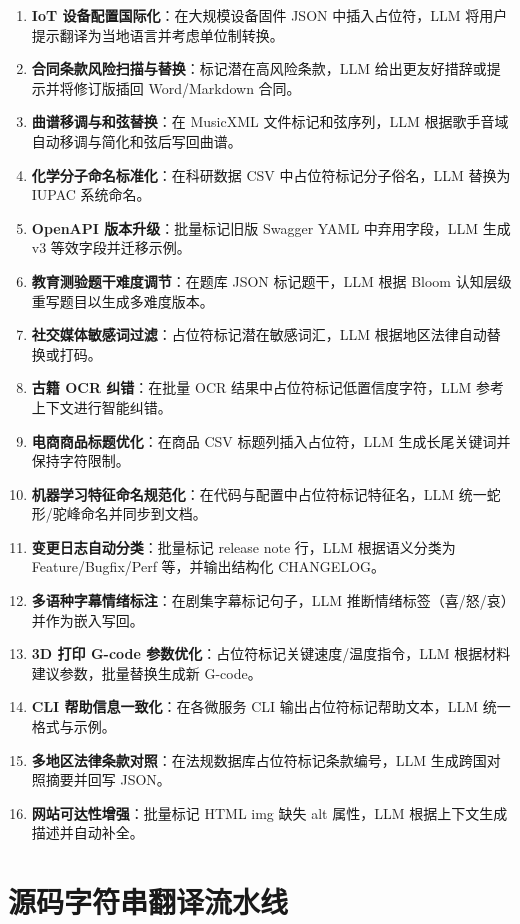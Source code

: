 \documentclass[12pt]{article}
\begin{document}
\begin{enumerate}
  \item \textbf{IoT 设备配置国际化}：在大规模设备固件 JSON 中插入占位符，LLM 将用户提示翻译为当地语言并考虑单位制转换。
  \item \textbf{合同条款风险扫描与替换}：标记潜在高风险条款，LLM 给出更友好措辞或提示并将修订版插回 Word/Markdown 合同。
  \item \textbf{曲谱移调与和弦替换}：在 MusicXML 文件标记和弦序列，LLM 根据歌手音域自动移调与简化和弦后写回曲谱。
  \item \textbf{化学分子命名标准化}：在科研数据 CSV 中占位符标记分子俗名，LLM 替换为 IUPAC 系统命名。
  \item \textbf{OpenAPI 版本升级}：批量标记旧版 Swagger YAML 中弃用字段，LLM 生成 v3 等效字段并迁移示例。
  \item \textbf{教育测验题干难度调节}：在题库 JSON 标记题干，LLM 根据 Bloom 认知层级重写题目以生成多难度版本。
  \item \textbf{社交媒体敏感词过滤}：占位符标记潜在敏感词汇，LLM 根据地区法律自动替换或打码。
  \item \textbf{古籍 OCR 纠错}：在批量 OCR 结果中占位符标记低置信度字符，LLM 参考上下文进行智能纠错。
  \item \textbf{电商商品标题优化}：在商品 CSV 标题列插入占位符，LLM 生成长尾关键词并保持字符限制。
  \item \textbf{机器学习特征命名规范化}：在代码与配置中占位符标记特征名，LLM 统一蛇形/驼峰命名并同步到文档。
  \item \textbf{变更日志自动分类}：批量标记 release note 行，LLM 根据语义分类为 Feature/Bugfix/Perf 等，并输出结构化 CHANGELOG。
  \item \textbf{多语种字幕情绪标注}：在剧集字幕标记句子，LLM 推断情绪标签（喜/怒/哀）并作为嵌入写回。
  \item \textbf{3D 打印 G-code 参数优化}：占位符标记关键速度/温度指令，LLM 根据材料建议参数，批量替换生成新 G-code。
  \item \textbf{CLI 帮助信息一致化}：在各微服务 CLI 输出占位符标记帮助文本，LLM 统一格式与示例。
  \item \textbf{多地区法律条款对照}：在法规数据库占位符标记条款编号，LLM 生成跨国对照摘要并回写 JSON。
  \item \textbf{网站可达性增强}：批量标记 HTML img 缺失 alt 属性，LLM 根据上下文生成描述并自动补全。
\end{enumerate}

\section{源码字符串翻译流水线}
\end{document}
